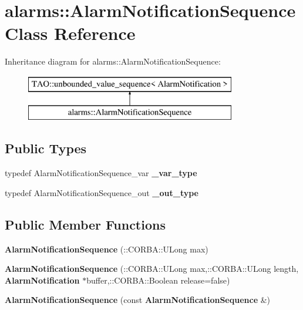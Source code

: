 \section{alarms\+:\+:Alarm\+Notification\+Sequence Class Reference}
\label{classalarms_1_1AlarmNotificationSequence}
Inheritance diagram for alarms\+:\+:Alarm\+Notification\+Sequence\+:\begin{figure}[H]
\begin{center}
\leavevmode
\includegraphics[height=2.000000cm]{classalarms_1_1AlarmNotificationSequence}
\end{center}
\end{figure}
\subsection*{Public Types}
\begin{DoxyCompactItemize}
\item 
typedef Alarm\+Notification\+Sequence\+\_\+var {\bfseries \+\_\+var\+\_\+type}\label{classalarms_1_1AlarmNotificationSequence_ad195472482c02c2b57baa35bd3844999}

\item 
typedef Alarm\+Notification\+Sequence\+\_\+out {\bfseries \+\_\+out\+\_\+type}\label{classalarms_1_1AlarmNotificationSequence_af6c1fc3ed6ccb57eb67d8dcff75209cc}

\end{DoxyCompactItemize}
\subsection*{Public Member Functions}
\begin{DoxyCompactItemize}
\item 
{\bfseries Alarm\+Notification\+Sequence} (\+::C\+O\+R\+B\+A\+::\+U\+Long max)\label{classalarms_1_1AlarmNotificationSequence_ac332ce99495c89606f814dfcbb1b75ba}

\item 
{\bfseries Alarm\+Notification\+Sequence} (\+::C\+O\+R\+B\+A\+::\+U\+Long max,\+::C\+O\+R\+B\+A\+::\+U\+Long length, {\bf Alarm\+Notification} $\ast$buffer,\+::C\+O\+R\+B\+A\+::\+Boolean release=false)\label{classalarms_1_1AlarmNotificationSequence_a8dd8bef4f0f052bf97f04b3a74649110}

\item 
{\bfseries Alarm\+Notification\+Sequence} (const {\bf Alarm\+Notification\+Sequence} \&)\label{classalarms_1_1AlarmNotificationSequence_a7bcb09447e96afc5319ef84e46c32736}

\end{DoxyCompactItemize}
